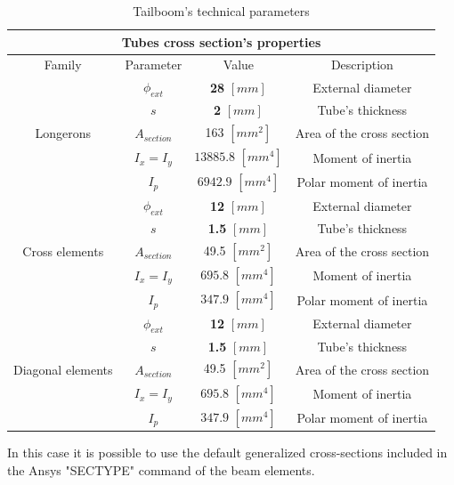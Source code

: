 \medskip
\begin{table}[h!]
	\centering
	
	\begin{tabular}{c c c c} 
		\toprule
		\multicolumn{4}{c}{Tubes cross section's properties}\\
		\midrule
		Family & Parameter & Value & Description \\
		\midrule
		& $\phi_{ext}$ &  \textbf{28} $[mm]$ & External diameter \\
		& $s$ &  \textbf{2} $[mm]$ & Tube's thickness \\ 
		Longerons & $A_{section}$  &  163 $[mm^2]$ & Area of the cross section \\ 
		& $I_{x} = I_{y}$ &  $13885.8$ $[mm^4]$ & Moment of inertia \\ 
		& $I_{p}$ &  $6942.9$ $[mm^4]$ & Polar moment of inertia \\
		

		\midrule
		& $\phi_{ext}$ &  \textbf{12} $[mm]$ & External diameter \\
		& $s$ &  \textbf{1.5} $[mm]$ & Tube's thickness \\ 
		Cross elements & $A_{section}$  &  49.5 $[mm^2]$ & Area of the cross section \\ 
		& $I_{x} = I_{y}$ &  $695.8$ $[mm^4]$ & Moment of inertia \\ 
		& $I_{p}$ &  $347.9$ $[mm^4]$ & Polar moment of inertia \\
		
		
		\midrule
		& $\phi_{ext}$ &  \textbf{12} $[mm]$ & External diameter \\
		& $s$ &  \textbf{1.5} $[mm]$ & Tube's thickness \\ 
		Diagonal elements & $A_{section}$  &  49.5 $[mm^2]$ & Area of the cross section \\ 
		& $I_{x} = I_{y}$ &  $695.8$ $[mm^4]$ & Moment of inertia \\ 
		& $I_{p}$ &  $347.9$ $[mm^4]$ & Polar moment of inertia \\
		
			
		\bottomrule
	\end{tabular}
	\caption{Tailboom's technical parameters}
	
\end{table}

\noindent
In this case it is possible to use the default generalized cross-sections included in the Ansys "SECTYPE" command of the beam elements.




